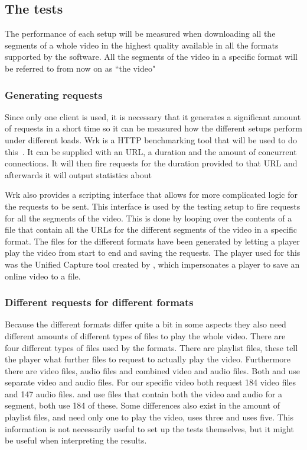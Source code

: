 \documentclass[twoside,openright]{uva-bachelor-thesis}
\begin{document}
\subsection{The tests}
The performance of each setup will be measured when downloading all the
segments of a whole video in the highest quality available in all the formats
supported by the \usp software. All the segments of the video in a specific
format will be referred to from now on as ``the video"

\subsubsection{Generating requests}
Since only one client is used, it is necessary that it generates a significant
amount of requests in a short time so it can be measured how the different
setups perform under different loads. Wrk is a HTTP benchmarking tool that will
be used to do this~\autocite{wrk}. It can be supplied with an URL, a duration
and the amount of concurrent connections. It will then fire requests for the
duration provided to that URL and afterwards it will output statistics about

Wrk also provides a scripting interface that allows for more complicated logic
for the requests to be sent. This interface is used by the testing setup to fire
requests for all the segments of the video. This is done by looping over the
contents of a file that contain all the URLs for the different segments of the
video in a specific format. The files for the different formats have been
generated by letting a player play the video from start to end and saving the
requests. The player used for this was the Unified Capture tool created by \usp,
which impersonates a player to save an online video to a file.

\subsubsection{Different requests for different formats}\label{sec:filediff}
Because the different \abs formats differ quite a bit in some aspects they also
need different amounts of different types of files to play the whole
video. There are four different types of files used by the formats. There are
playlist files, these tell the player what further files to request to actually
play the video. Furthermore there are video files, audio files and combined
video and audio files. Both \dash and \iss use separate video and audio files.
For our specific video both request 184 video files and 147 audio files. \hds
and \hls use files that contain both the video and audio for a segment, both use
184 of these. Some differences also exist in the amount of playlist files, \iss
and \hds need only one to play the video, \dash uses three and \hls uses five.
This information is not necessarily useful to set up the tests themselves, but
it might be useful when interpreting the results.
\end{document}
